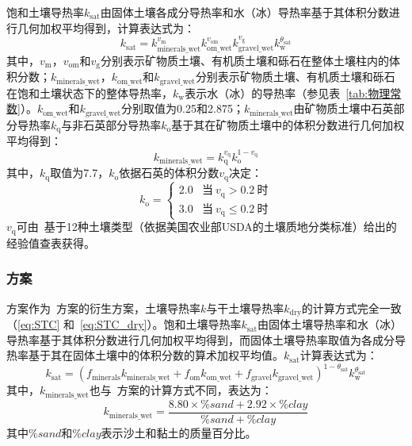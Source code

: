 饱和土壤导热率$k_{\mathrm{sat}}$由固体土壤各成分导热率和水（冰）导热率基于其体积分数进行几何加权平均得到，计算表达式为：
\begin{equation}\label{eq:STC_wet}
  k_{\mathrm{sat}}=k_{\mathrm{minerals\_wet}}^{v_{\mathrm {m}} }k_{\mathrm{om\_wet}}^{v_{\mathrm{om}}}k_{\mathrm{gravel\_wet}}^{v_{\mathrm {g}} }k_{\mathrm {w}} ^{\theta_{\mathrm {sat}} }
\end{equation}
其中，$v_{\mathrm {m}} $，$v_{\mathrm{om}}$和$v_{\mathrm {g}} $分别表示矿物质土壤、有机质土壤和砾石在整体土壤柱内的体积分数；$k_{\mathrm{minerals\_wet}}$，$k_{\mathrm{om\_wet}}$和$k_{\mathrm{gravel\_wet}}$分别表示矿物质土壤、有机质土壤和砾石在饱和土壤状态下的整体导热率，$k_{\mathrm {w}} $表示水（冰）的导热率（参见表~\ref{tab:物理常数}）。$k_{\mathrm{om\_wet}}$和$k_{\mathrm{gravel\_wet}}$分别取值为0.25和2.875；$k_{\mathrm{minerals\_wet}}$由矿物质土壤中石英部分导热率$k_{\mathrm {q}} $与非石英部分导热率$k_{\mathrm {o}} $基于其在矿物质土壤中的体积分数进行几何加权平均得到：
$$k_{\mathrm{minerals\_wet}}=k_{\mathrm {q}} ^{v_{\mathrm {q}} }k_{\mathrm {o}} ^{1-v_{\mathrm {q}} }$$
其中，$k_{\mathrm {q}} $取值为7.7，$k_{\mathrm {o}} $依据石英的体积分数$v_{\mathrm {q}} $决定：
\begin{equation}
  k_{\mathrm {o}} =\begin{cases}
    2.0 & \text {当}\ v_{\mathrm {q}} >0.2\ \text {时} \\
    3.0 & \text {当}\ v_{\mathrm {q}} \leqslant 0.2\ \text {时}
  \end{cases}
\end{equation}
$v_{\mathrm {q}} $可由~\citet{PL_98}基于12种土壤类型（依据美国农业部USDA的土壤质地分类标准）给出的经验值查表获得。

\subsubsection{\citet{farouki1981thermal}方案}
\citet{farouki1981thermal}方案作为~\citet{Johansen1975}方案的衍生方案，土壤导热率$k$与干土壤导热率$k_{\mathrm{dry}}$的计算方式完全一致（\eqref{eq:STC} 和~\eqref{eq:STC_dry}）。饱和土壤导热率$k_{\mathrm{sat}}$由固体土壤导热率和水（冰）导热率基于其体积分数进行几何加权平均得到，而固体土壤导热率取值为各成分导热率基于其在固体土壤中的体积分数的算术加权平均值。$k_{\mathrm{sat}}$计算表达式为：
\begin{equation}\label{eq:STC_wet_Farouki}
  k_{\mathrm{sat}}=(f_{\mathrm{minerals}}k_{\mathrm{minerals\_wet}}+f_{\mathrm{om}}k_{\mathrm{om\_wet}}+f_{\mathrm{gravel}}k_{\mathrm{gravel\_wet}})^{1-\theta_{\mathrm {sat}} }k_{\mathrm {w}} ^{\theta_{\mathrm {sat}} }
\end{equation}
其中，$k_{\mathrm{minerals\_wet}}$也与~\citet{Johansen1975}方案的计算方式不同，表达为：$$k_{\mathrm{minerals\_wet}}=\frac{8.80\times\%sand+2.92\times\%clay}{\%sand+\%clay}$$
其中$\%sand$和$\%clay$表示沙土和黏土的质量百分比。

